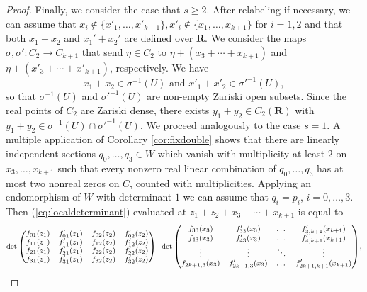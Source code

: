 \documentclass[12pt]{amsart}
\numberwithin{equation}{section}
\numberwithin{thmcounter}{section}
\theoremstyle{definition}
\theoremstyle{claim}
\newcommand{\nR}{\mathbf{R}}
\begin{document}
\begin{proof}
\noindent        Finally, we consider the case that $s\geq2$. After relabeling if necessary, we can assume that $x_{i} \notin \{x'_1,\ldots,x'_{k+1}\},x'_{i}\notin\{x_1,\ldots,x_{k+1}\}$ for $i=1,2$ and that both $x_1+x_2$ and $x_1'+x_2'$ are defined over $\nR$.
    We consider the maps $\sigma,\sigma'\colon C_{2}\to C_{k+1}$ that send $\eta\in C_{2}$ to $\eta+(x_3+\cdots+x_{k+1})$ and $\eta+(x'_3+\cdots+x'_{k+1})$, respectively. We have
    \begin{equation*}
        x_1+x_2\in\sigma^{-1}(U) \textrm{ and } x'_1+x'_2\in\sigma'^{-1}(U),
    \end{equation*}
    so that $\sigma^{-1}(U)$ and $\sigma'^{-1}(U)$ are non-empty Zariski open subsets. Since the real points of $C_2$ are Zariski dense, there exists $y_1+y_2\in C_2(\nR)$ with $y_1+y_2\in\sigma^{-1}(U)\cap\sigma'^{-1}(U)$. We proceed analogously to the case $s=1$. A multiple application of Corollary \ref{cor:fixdouble} shows that there are linearly independent sections $q_0,\ldots,q_3\in W$ which vanish with multiplicity at least $2$ on $x_3,\ldots,x_{k+1}$ such that every nonzero real linear combination of $q_0,\ldots,q_3$ has at most two nonreal zeros on $C$, counted with multiplicities. Applying an endomorphism of $W$ with determinant $1$ we can assume that $q_i=p_i$, $i=0,\ldots,3$. Then (\ref{eq:localdeterminant}) evaluated at $z_1+z_2+x_3+\cdots+x_{k+1}$ is equal to
\begin{equation*}
       \text{\footnotesize\(\det
        \begin{pmatrix}
		f_{01}(z_1) & f'_{01}(z_1) & f_{02}(z_2) & f'_{02}(z_2) \\
		f_{11}(z_1) & f'_{11}(z_1) & f_{12}(z_2) & f'_{12}(z_2) \\
		f_{21}(z_1) & f'_{21}(z_1) & f_{22}(z_2) & f'_{22}(z_2) \\
		f_{31}(z_1) & f'_{31}(z_1) & f_{32}(z_2) & f'_{32}(z_2) \\
	\end{pmatrix}\cdot\det
        \begin{pmatrix}
		 f_{33}(x_3) & f'_{33}(x_3)& \dots  & f'_{3,k+1}(x_{k+1}) \\
		 f_{43}(x_3) & f'_{43}(x_3)& \dots  & f'_{4,k+1}(x_{k+1}) \\
		\vdots & \vdots & \ddots & \vdots  \\
		 f_{2k+1,3}(x_3) & f'_{2k+1,3}(x_3)& \dots & f'_{2k+1,k+1}(x_{k+1})
	\end{pmatrix}\)},
	\end{equation*}

\end{proof}
\end{document}
